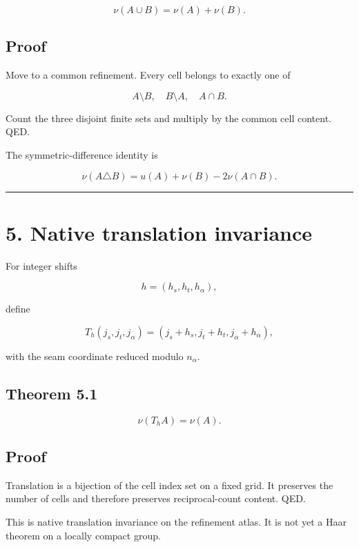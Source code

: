 \[
\nu(A\cup B)=\nu(A)+\nu(B).
\tag{4.3}
\]

\hypertarget{proof-1}{%
\subsection{Proof}\label{proof-1}}

Move to a common refinement. Every cell belongs to exactly one of

\[
A\setminus B,
\quad
B\setminus A,
\quad
A\cap B.
\]

Count the three disjoint finite sets and multiply by the common cell content.
QED.

The symmetric-difference identity is

\[
\boxed{
\nu(A\triangle B)
=
u(A)+\nu(B)-2\nu(A\cap B).
}
\tag{4.4}
\]

\begin{center}\rule{0.5\linewidth}{0.5pt}\end{center}

\hypertarget{native-translation-invariance}{%
\section{5. Native translation invariance}\label{native-translation-invariance}}

For integer shifts

\[
h=(h_s,h_t,h_\alpha),
\]

define

\[
T_h(j_s,j_t,j_\alpha)
=
(j_s+h_s,j_t+h_t,j_\alpha+h_\alpha),
\tag{5.1}
\]

with the seam coordinate reduced modulo \(n_\alpha\).

\hypertarget{theorem-5.1}{%
\subsection{Theorem 5.1}\label{theorem-5.1}}

\[
\boxed{
\nu(T_hA)=\nu(A).
}
\tag{5.2}
\]

\hypertarget{proof-2}{%
\subsection{Proof}\label{proof-2}}

Translation is a bijection of the cell index set on a fixed grid. It preserves
the number of cells and therefore preserves reciprocal-count content. QED.

This is native translation invariance on the refinement atlas. It is not yet a
Haar theorem on a locally compact group.

